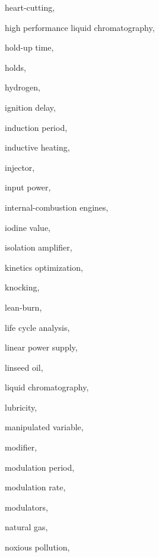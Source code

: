 \begin{theindex}
  \item \lowercase {heart-cutting}, 
  \item \lowercase {high performance liquid chromatography}, 
  \item \lowercase {hold-up time}, 
  \item \lowercase {holds}, 
  \item \lowercase {hydrogen}, 
  \item \lowercase {ignition delay}, 
  \item \lowercase {induction period}, 
  \item \lowercase {inductive heating}, 
  \item \lowercase {injector}, 
  \item \lowercase {input power}, 
  \item \lowercase {internal\hyp  {}combustion engines}, 
  \item \lowercase {iodine value}, 
  \item \lowercase {isolation amplifier}, 
  \item \lowercase {kinetics optimization}, 
  \item \lowercase {knocking}, 
  \item \lowercase {lean-burn}, 
  \item \lowercase {life cycle analysis}, 
  \item \lowercase {linear power supply}, 
  \item \lowercase {linseed oil}, 
  \item \lowercase {liquid chromatography}, 
  \item \lowercase {lubricity}, 
  \item \lowercase {manipulated variable}, 
  \item \lowercase {modifier}, 
  \item \lowercase {modulation period}, 
  \item \lowercase {modulation rate}, 
  \item \lowercase {modulators}, 
  \item \lowercase {natural gas}, 
  \item \lowercase {noxious pollution}, 

\end{theindex}
